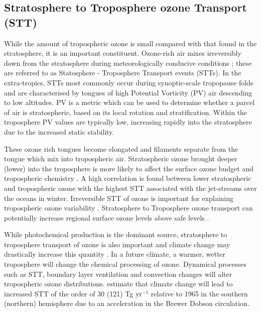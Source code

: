   \subsection{Stratosphere to Troposphere ozone Transport (STT)}
  
    While the amount of tropospheric ozone is small compared with that found in the stratosphere, it is an important constituent.
    Ozone-rich air mixes irreversibly down from the stratosphere during meteorologically conducive conditions \citep{Sprenger2003,Mihalikova2012}; these are referred to as Statosphere - Troposphere Transport events (STTs). 
    In the extra-tropics, STTs most commonly occur during synoptic-scale tropopause folds \citep{Sprenger2003} and are characterised by tongues of high Potential Vorticity (PV) air descending to low altitudes. 
    PV is a metric which can be used to determine whether a parcel of air is stratospheric, based on its local rotation and stratification.
    Within the troposphere PV values are typically low, increasing rapidly into the stratosphere due to the increased static stability.
    
    These ozone rich tongues become elongated and filaments separate from the tongue which mix into tropospheric air.
    Stratospheric ozone brought deeper (lower) into the troposphere is more likely to affect the surface ozone budget and tropospheric chemistry \citep{Zanis2003,Langford_2009}.
    A high correlation is found between lower stratospheric and tropospheric ozone \citep{Terao2008} with the highest STT associated with the jet-streams over the oceans in winter.
    Irreversible STT of ozone is important for explaining tropospheric ozone variability \citep{Tang2010}.
    Stratosphere to Troposphere ozone transport can potentially increase regional surface ozone levels above safe levels \citep{Zhang2014}.
    
    While photochemical production is the dominant source, stratosphere to troposphere transport of ozone is also important and climate change may drastically increase this quantity \citep{Hegglin_2009}.
    In a future climate, a warmer, wetter troposphere will change the chemical processing of ozone.
    Dynamical processes such as STT, boundary layer ventilation and convection changes will alter tropospheric ozone distributions.
    \citet{Hegglin_2009} estimate that climate change will lead to increased STT of the order of 30 (121) Tg yr$^{-1}$ relative to 1965 in the southern (northern) hemisphere due to an acceleration in the Brewer Dobson circulation. 
    
